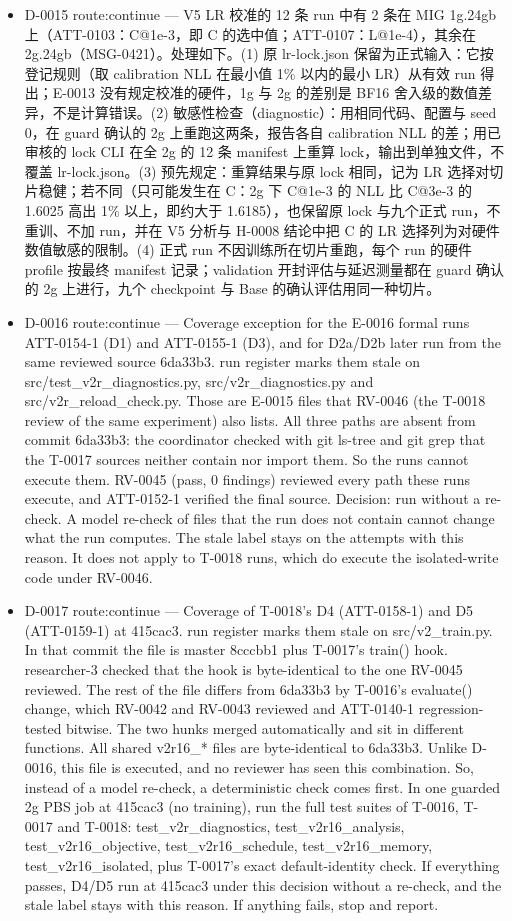 \documentclass[11pt]{article}
\begin{document}
\begin{itemize}
\item D-0015 route:continue --- V5 LR 校准的 12 条 run 中有 2 条在 MIG 1g.24gb 上（ATT-0103：C@1e-3，即 C 的选中值；ATT-0107：L@1e-4），其余在 2g.24gb（MSG-0421）。处理如下。(1) 原 lr-lock.json 保留为正式输入：它按登记规则（取 calibration NLL 在最小值 1\% 以内的最小 LR）从有效 run 得出；E-0013 没有规定校准的硬件，1g 与 2g 的差别是 BF16 舍入级的数值差异，不是计算错误。(2) 敏感性检查（diagnostic）：用相同代码、配置与 seed 0，在 guard 确认的 2g 上重跑这两条，报告各自 calibration NLL 的差；用已审核的 lock CLI 在全 2g 的 12 条 manifest 上重算 lock，输出到单独文件，不覆盖 lr-lock.json。(3) 预先规定：重算结果与原 lock 相同，记为 LR 选择对切片稳健；若不同（只可能发生在 C：2g 下 C@1e-3 的 NLL 比 C@3e-3 的 1.6025 高出 1\% 以上，即约大于 1.6185），也保留原 lock 与九个正式 run，不重训、不加 run，并在 V5 分析与 H-0008 结论中把 C 的 LR 选择列为对硬件数值敏感的限制。(4) 正式 run 不因训练所在切片重跑，每个 run 的硬件 profile 按最终 manifest 记录；validation 开封评估与延迟测量都在 guard 确认的 2g 上进行，九个 checkpoint 与 Base 的确认评估用同一种切片。
\item D-0016 route:continue --- Coverage exception for the E-0016 formal runs ATT-0154-1 (D1) and ATT-0155-1 (D3), and for D2a/D2b later run from the same reviewed source 6da33b3. run register marks them stale on src/test\_v2r\_diagnostics.py, src/v2r\_diagnostics.py and src/v2r\_reload\_check.py. Those are E-0015 files that RV-0046 (the T-0018 review of the same experiment) also lists. All three paths are absent from commit 6da33b3: the coordinator checked with git ls-tree and git grep that the T-0017 sources neither contain nor import them. So the runs cannot execute them. RV-0045 (pass, 0 findings) reviewed every path these runs execute, and ATT-0152-1 verified the final source. Decision: run without a re-check. A model re-check of files that the run does not contain cannot change what the run computes. The stale label stays on the attempts with this reason. It does not apply to T-0018 runs, which do execute the isolated-write code under RV-0046.
\item D-0017 route:continue --- Coverage of T-0018's D4 (ATT-0158-1) and D5 (ATT-0159-1) at 415cac3. run register marks them stale on src/v2\_train.py. In that commit the file is master 8cccbb1 plus T-0017's train() hook. researcher-3 checked that the hook is byte-identical to the one RV-0045 reviewed. The rest of the file differs from 6da33b3 by T-0016's evaluate() change, which RV-0042 and RV-0043 reviewed and ATT-0140-1 regression-tested bitwise. The two hunks merged automatically and sit in different functions. All shared v2r16\_* files are byte-identical to 6da33b3. Unlike D-0016, this file is executed, and no reviewer has seen this combination. So, instead of a model re-check, a deterministic check comes first. In one guarded 2g PBS job at 415cac3 (no training), run the full test suites of T-0016, T-0017 and T-0018: test\_v2r\_diagnostics, test\_v2r16\_analysis, test\_v2r16\_objective, test\_v2r16\_schedule, test\_v2r16\_memory, test\_v2r16\_isolated, plus T-0017's exact default-identity check. If everything passes, D4/D5 run at 415cac3 under this decision without a re-check, and the stale label stays with this reason. If anything fails, stop and report.

\end{itemize}
\end{document}
